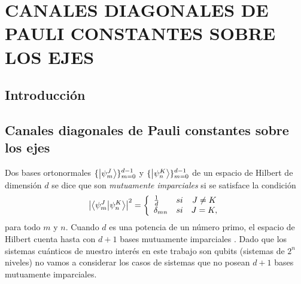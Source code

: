 \chapter{CANALES DIAGONALES DE PAULI CONSTANTES SOBRE LOS EJES}

\section{Introducción} %

\section{Canales diagonales de Pauli constantes sobre los ejes} %

Dos bases ortonormales $\{\ket{\psi_m^J}\}_{m=0}^{d-1}$
y $\{\ket{\psi_n^K}\}_{m=0}^{d-1}$ de un espacio de Hilbert
de dimensión $d$ se dice que son \textit{mutuamente 
imparciales} si se satisface la 
condición~\cite{bengtsson_zyczkowski_2017,nathanson2007pauli}
\begin{align}\label{eq:mub_definition}
	\abs{\braket{\psi_m^J}{\psi_n^K}}^2=
	\left\{ \begin{array}{lcc}
             \frac{1}{d} & si & J\ne K \\
             \delta_{mn} & si & J=K,
             \end{array}
   \right.
\end{align}
para todo $m$ y $n$. Cuando $d$  es una potencia de un 
número primo, el espacio de Hilbert cuenta hasta con $d+1$ bases mutuamente
imparciales \cite{durt2010mutually}. 
Dado que los sistemas cuánticos de nuestro interés en este trabajo son qubits 
(sistemas de $2^n$ niveles) no vamos a considerar los casos de sistemas que 
no posean $d+1$ bases mutuamente imparciales. 

